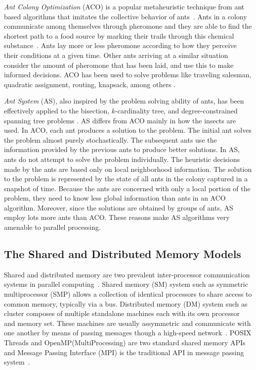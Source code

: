 \documentclass[11pt]{article}
\begin{document}

\textit{Ant Colony Optimization} (ACO) is a popular metaheuristic technique from ant based algorithms that imitates the collective behavior of ants~\cite{DD}. Ants in a colony communicate among themselves through pheromone and they are able to find the shortest path to a food source by marking their trails through this chemical substance~\cite{BDT, DG}. Ants lay more or less pheromone according to how they perceive their conditions at a given time. Other ants arriving at a similar situation consider the amount of pheromone that has been laid, and use this to make informed decisions. ACO has been used to solve problems like traveling salesman, quadratic assignment, routing, knapsack, among others \cite{DG, TAIL, MC}.

\textit{Ant System} (AS), also inspired by the problem solving ability of ants, has been effectively applied to the bisection, $k$-cardinality tree, and degree-constrained spanning tree problems \cite{BS2, BS1, BZ}.  AS differs from ACO mainly in how the insects are used. In ACO, each ant produces a solution to the problem. The initial ant solves the problem almost purely stochastically. The subsequent ants use the information provided by the previous ants to produce better solutions. In AS, ants do not attempt to solve the problem individually. The heuristic decisions made by the ants are based only on local neighborhood information. The solution to the problem is represented by the state of all ants in the colony captured in a snapshot of time. Because the ants are concerned with only a local portion of the problem, they need to know less global information than ants in an ACO algorithm. Moreover, since the solutions are obtained by groups of ants, AS employ lots more ants than ACO.   These reasons make AS algorithms very amenable to parallel processing. 


\subsection{The Shared and Distributed Memory Models}


Shared and distributed memory are two prevalent inter-processor communication systems in parallel computing~\cite{PH}. Shared memory (SM) system such as symmetric multiprocessor (SMP) allows a collection of identical processors to share access to common memory, typically via a bus.  Distributed memory (DM) system such as cluster composes of multiple standalone machines each with its own processor and memory set. These machines are usually assymmetric and communicate with one another by means of passing messages though a high-speed network~\cite{cluster}.  POSIX Threads and OpenMP(MultiProcessing) are two standard shared memory APIs and Message Passing Interface (MPI) is the traditional API in message passing system~\cite{MPI,OpenMP}.
\end{document}
